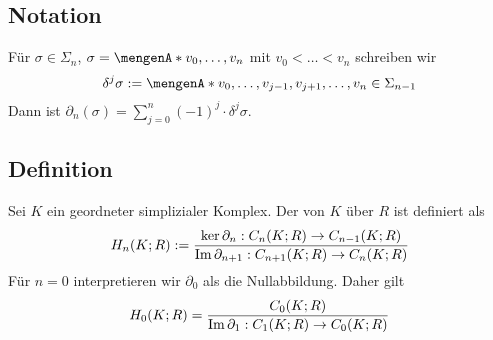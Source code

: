 \subsection[Notation für das Weglassen eines Knotens]{Notation} %
\label{sub:39}
Für $\sigma \in \Sigma_n$, $ \sigma= \set{v_0, \ldots ,v_n} $ mit $v_0 < \ldots < v_n$ schreiben wir 
\[
	\delta^j \sigma := \set{v_0 , \ldots , v_{j-1}, v_{j+1}, \ldots , v_n}  \in \Sigma_{n-1}
\]
Dann ist $\partial_n(\sigma) = \sum_{j=0}^{n} (-1)^j \cdot \delta^j \sigma$.

\subsection[Definition: $n$-ter Homologiemodul]{Definition} %
\label{sub:310}
Sei $K$ ein geordneter simplizialer Komplex. Der  von 
$K$ über $R$ ist definiert als
\[
	H_n(K;R) := \frac{\ker \partial_n : C_n(K;R) \to C_{n-1}(K;R)}{\operatorname{Im} \partial_{n+1} : C_{n+1}(K;R) \to C_n(K;R)} 
\]
Für $n=0$ interpretieren wir $\partial_0$ als die Nullabbildung. Daher gilt 
\[
	H_0(K;R) = \frac{C_0(K;R)}{\operatorname{Im} \partial_1 : C_1(K;R) \to C_0(K;R)} 
\]

